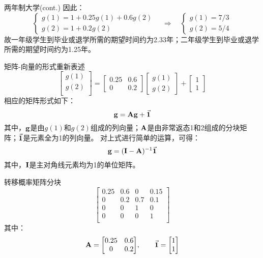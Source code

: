 \documentclass[t]{beamer}
\begin{document}
\begin{frame}{两年制大学(cont.)}
        因此：
    \[\begin{cases}
    g(1)=1+0.25g(1)+0.6g(2)\\
    g(2)=1+0.2g(2)
    \end{cases}\quad\Rightarrow\quad\begin{cases}
    g(1)=7/3\\
    g(2)=5/4
    \end{cases} \]
    故一年级学生到毕业或退学所需的期望时间约为2.33年；二年级学生到毕业或退学所需的期望时间约为1.25年。
\end{frame}

\begin{frame}{矩阵-向量的形式重新表述}
    \[\begin{bmatrix}
        g(1)\\
        g(2)\\
        \end{bmatrix}=\begin{bmatrix}
        0.25 & 0.6\\
        0 &0.2
        \end{bmatrix}\begin{bmatrix}
        g(1)\\g(2)
        \end{bmatrix}+\begin{bmatrix}
        1\\1
        \end{bmatrix} \]
        相应的矩阵形式如下：
        \begin{equation*}
        {\bf g}={\bf Ag}+\vec{\bf 1} 
        \end{equation*}
        其中，${\bf g}$是由$g(1)$和$g(2)$组成的列向量；${\bf A}$是由非常返态1和2组成的分块矩阵；$\vec{\bf 1}$是元素全为1的列向量。
        对上式进行简单的运算，可得：
\begin{equation*}
{\bf g}=({\bf I}-{\bf A})^{-1}\vec{\bf 1}
\end{equation*}
其中，${\bf I}$是主对角线元素均为1的单位矩阵。
\end{frame}

\begin{frame}{转移概率矩阵分块}
    \[\left[\begin{array}{cc|c|c}
        0.25 &      0.6&    0&    0.15 \\
        0   &      0.2&  0.7&    0.1\\\hline
        0  &        0&    1&    0      \\
        0    &       0 &   0 &        1 \\
        \end{array}\right] \]
        其中：\[{{\bf A}=\begin{bmatrix}
            0.25&0.6\\0&0.2
            \end{bmatrix}},\qquad {\vec{\bf 1}=\begin{bmatrix}
            1\\1
            \end{bmatrix}}\]
\end{frame}
\end{document}
